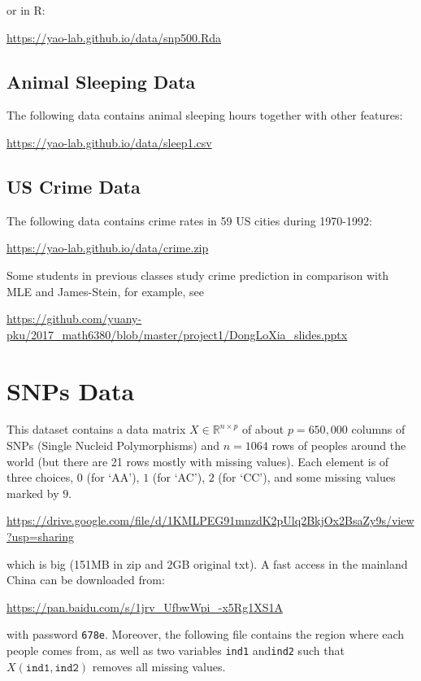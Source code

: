 \documentclass[11pt]{article}
\def\R{{\mathbb R}}
\begin{document}
\noindent or in R: 

\url{https://yao-lab.github.io/data/snp500.Rda}


\subsection{Animal Sleeping Data} The following data contains animal sleeping hours together with other features: 

\url{https://yao-lab.github.io/data/sleep1.csv}

\subsection{US Crime Data} The following data contains crime rates in 59 US cities during 1970-1992:

\url{https://yao-lab.github.io/data/crime.zip}

\noindent Some students in previous classes study crime prediction in comparison with MLE and James-Stein, for example, see

\url{https://github.com/yuany-pku/2017_math6380/blob/master/project1/DongLoXia_slides.pptx}

\section{SNPs Data}
This dataset contains a data matrix $X\in \R^{n\times p}$ of about $p=650,000$ columns of SNPs (Single Nucleid Polymorphisms) and $n=1064$ rows of peoples around the world (but there are 21 rows mostly with missing values). Each element is of three choices, $0$ (for `AA'), $1$ (for `AC'), $2$ (for `CC'), and some missing values marked by $9$. 

\url{https://drive.google.com/file/d/1KMLPEG91mnzdK2pUlq2BkjOx2BsaZy9s/view?usp=sharing}

\noindent which is big (151MB in zip and 2GB original txt). A fast access in the mainland China can be downloaded from:

\url{https://pan.baidu.com/s/1jrv_UfbwWpi_-x5Rg1XS1A}  

\noindent with password {\tt 678e}. Moreover, the following file contains the region where each people comes from, as well as two variables {\texttt{ind1}} and{\texttt{ind2}} such that $X({\texttt{ind1}},{\texttt{ind2}})$ removes all missing values. 
\end{document}
